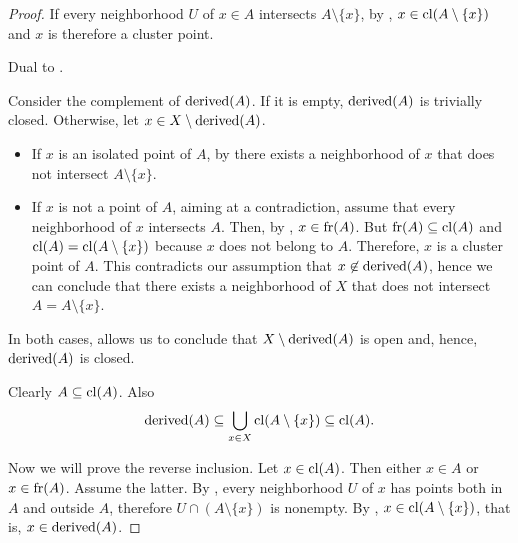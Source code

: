 \begin{proof}
   If every neighborhood \( U \) of \( x \in A \) intersects \( A \setminus \{ x \} \), by , \( x \in \operatorname{cl}(A \setminus \{ x \}) \) and \( x \) is therefore a cluster point.

   Dual to .

   Consider the complement of \( \operatorname{derived}(A) \). If it is empty, \( \operatorname{derived}(A) \) is trivially closed. Otherwise, let \( x \in X \setminus \operatorname{derived}(A) \).

  \begin{itemize}
    \item If \( x \) is an isolated point of \( A \), by  there exists a neighborhood of \( x \) that does not intersect \( A \setminus \{ x \} \).
    \item If \( x \) is not a point of \( A \), aiming at a contradiction, assume that every neighborhood of \( x \) intersects \( A \). Then, by , \( x \in \operatorname{fr}(A) \). But \( \operatorname{fr}(A) \subseteq \operatorname{cl}(A) \) and \( \operatorname{cl}(A) = \operatorname{cl}(A \setminus \{ x \}) \) because \( x \) does not belong to \( A \). Therefore, \( x \) is a cluster point of \( A \). This contradicts our assumption that \( x \not\in \operatorname{derived}(A) \), hence we can conclude that there exists a neighborhood of \( X \) that does not intersect \( A = A \setminus \{ x \} \).
  \end{itemize}

  In both cases,  allows us to conclude that \( X \setminus \operatorname{derived}(A) \) is open and, hence, \( \operatorname{derived}(A) \) is closed.

   Clearly \( A \subseteq \operatorname{cl}(A) \). Also
  \begin{equation*}
    \operatorname{derived}(A) \subseteq \bigcup_{x \in X} \operatorname{cl}(A \setminus \{ x \}) \subseteq \operatorname{cl}(A).
  \end{equation*}

  Now we will prove the reverse inclusion. Let \( x \in \operatorname{cl}(A) \). Then either \( x \in A \) or \( x \in \operatorname{fr}(A) \). Assume the latter. By , every neighborhood \( U \) of \( x \) has points both in \( A \) and outside \( A \), therefore \( U \cap (A \setminus \{ x \}) \) is nonempty. By , \( x \in \operatorname{cl}(A \setminus \{ x \}) \), that is, \( x \in \operatorname{derived}(A) \).


\end{proof}
